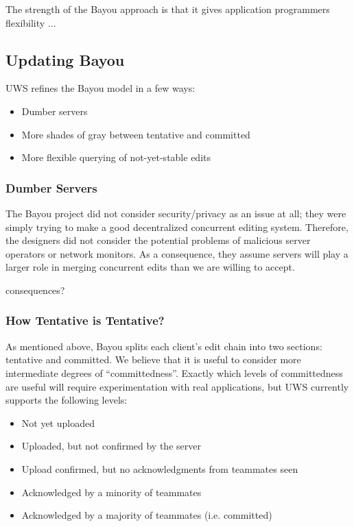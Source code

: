 \documentclass{article}
\begin{document}
The strength of the Bayou approach is that it gives application programmers flexibility ...

\subsection{Updating Bayou}

UWS refines the Bayou model in a few ways:

\begin{itemize}
\item Dumber servers
\item More shades of gray between tentative and committed
\item More flexible querying of not-yet-stable edits
\end{itemize}

\subsubsection{Dumber Servers}

The Bayou project did not consider security/privacy as an issue at all; they were simply trying to make a good decentralized concurrent editing system.
Therefore, the designers did not consider the potential problems of malicious server operators or network monitors.
As a consequence, they assume servers will play a larger role in merging concurrent edits than we are willing to accept.

consequences?

\subsubsection{How Tentative is Tentative?}

As mentioned above, Bayou splits each client's edit chain into two sections: tentative and committed.
We believe that it is useful to consider more intermediate degrees of ``committedness''.
Exactly which levels of committedness are useful will require experimentation with real applications, but UWS currently supports the following levels:

\begin{itemize}
\item Not yet uploaded
\item Uploaded, but not confirmed by the server
\item Upload confirmed, but no acknowledgments from teammates seen
\item Acknowledged by a minority of teammates
\item Acknowledged by a majority of teammates (i.e. committed)
\end{itemize}
\end{document}
